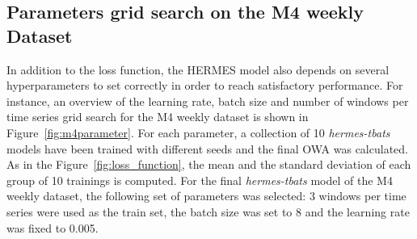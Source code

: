 \documentclass[review]{elsarticle}
\begin{document}
\subsection{Parameters grid search on the M4 weekly Dataset}
\label{sec:m4gridsearch}

In addition to the loss function, the HERMES model also depends on several hyperparameters to set correctly in order to reach satisfactory performance. For instance, an overview of the learning rate, batch size and number of windows per time series grid search for the M4 weekly dataset is shown in Figure~\ref{fig:m4parameter}. For each parameter, a collection of 10 \textit{hermes-tbats} models have been trained with different seeds and the final OWA was calculated. As in the Figure~\ref{fig:loss_function}, the mean and the standard deviation of each group of 10 trainings is computed. For the final \textit{hermes-tbats} model of the M4 weekly dataset,  the following set of parameters was selected: 3 windows per time series were used as the train set, the batch size was set to 8 and the learning rate was fixed to 0.005.
\end{document}
